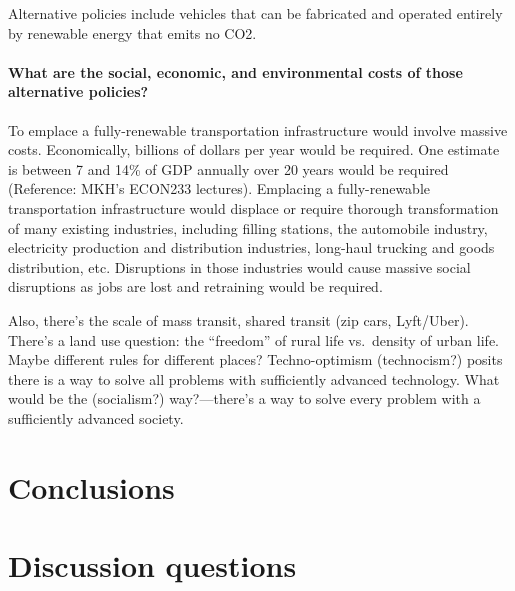 \documentclass[12pt]{article}
\begin{document}
Alternative policies include vehicles that can be fabricated and operated entirely by renewable energy that emits no CO2. 

\paragraph{What are the social, economic, and environmental costs of those alternative policies?} 

To emplace a fully-renewable transportation infrastructure would involve massive costs. 
Economically, billions of dollars per year would be required. 
One estimate is between 7 and 14\% of GDP annually 
over 20 years would be required (Reference: MKH’s ECON233 lectures). 
Emplacing a fully-renewable transportation infrastructure 
would displace or require thorough transformation of many existing industries, 
including filling stations, 
the automobile industry, 
electricity production and distribution industries, 
long-haul trucking and goods distribution, etc. 
Disruptions in those industries 
would cause massive social disruptions 
as jobs are lost and retraining would be required.

Also, there's the scale of mass transit, 
shared transit (zip cars, Lyft/Uber). 
There’s a land use question: 
the ``freedom'' of rural life vs.\ density of urban life. 
Maybe different rules for different places?
Techno-optimism (technocism?) 
posits there is a way to solve all problems with sufficiently advanced technology. 
What would be the (socialism?) way?---there's a way to solve every problem 
with a sufficiently advanced society.




\section{Conclusions}
\label{sec:conclusions}


\appendix

\section{Discussion questions}
\label{sec:discussion_questions}
\end{document}
